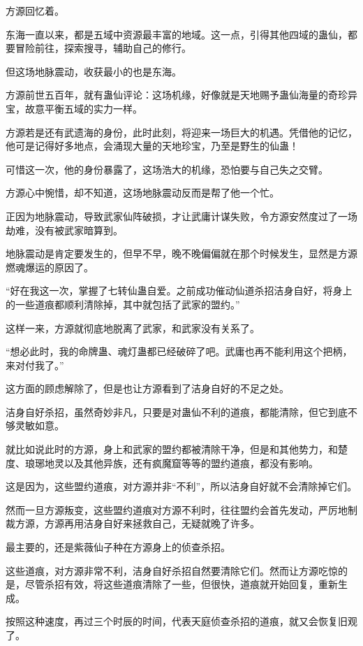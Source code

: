 \begin{this_body}
方源回忆着。

东海一直以来，都是五域中资源最丰富的地域。这一点，引得其他四域的蛊仙，都要冒险前往，探索搜寻，辅助自己的修行。

但这场地脉震动，收获最小的也是东海。

方源前世五百年，就有蛊仙评论：这场机缘，好像就是天地赐予蛊仙海量的奇珍异宝，故意平衡五域的实力一样。

方源若是还有武遗海的身份，此时此刻，将迎来一场巨大的机遇。凭借他的记忆，他可是记得好多地点，会涌现大量的天地珍宝，乃至是野生的仙蛊！

可惜这一次，他的身份暴露了，这场浩大的机缘，恐怕要与自己失之交臂。

方源心中惋惜，却不知道，这场地脉震动反而是帮了他一个忙。

正因为地脉震动，导致武家仙阵破损，才让武庸计谋失败，令方源安然度过了一场劫难，没有被武家暗算到。

地脉震动是肯定要发生的，但早不早，晚不晚偏偏就在那个时候发生，显然是方源燃魂爆运的原因了。

“好在我这一次，掌握了七转仙蛊自爱。之前成功催动仙道杀招洁身自好，将身上的一些道痕都顺利清除掉，其中就包括了武家的盟约。”

这样一来，方源就彻底地脱离了武家，和武家没有关系了。

“想必此时，我的命牌蛊、魂灯蛊都已经破碎了吧。武庸也再不能利用这个把柄，来对付我了。”

这方面的顾虑解除了，但是也让方源看到了洁身自好的不足之处。

洁身自好杀招，虽然奇妙非凡，只要是对蛊仙不利的道痕，都能清除，但它到底不够灵敏如意。

就比如说此时的方源，身上和武家的盟约都被清除干净，但是和其他势力，和楚度、琅琊地灵以及其他异族，还有疯魔窟等等的盟约道痕，都没有影响。

这是因为，这些盟约道痕，对方源并非“不利”，所以洁身自好就不会清除掉它们。

然而一旦方源叛变，这些盟约道痕对方源不利时，往往盟约会首先发动，严厉地制裁方源，方源再用洁身自好来拯救自己，无疑就晚了许多。

最主要的，还是紫薇仙子种在方源身上的侦查杀招。

这些道痕，对方源非常不利，洁身自好杀招自然要清除它们。然而让方源吃惊的是，尽管杀招有效，将这些道痕清除了一些，但很快，道痕就开始回复，重新生成。

按照这种速度，再过三个时辰的时间，代表天庭侦查杀招的道痕，就又会恢复旧观了。


\end{this_body}
